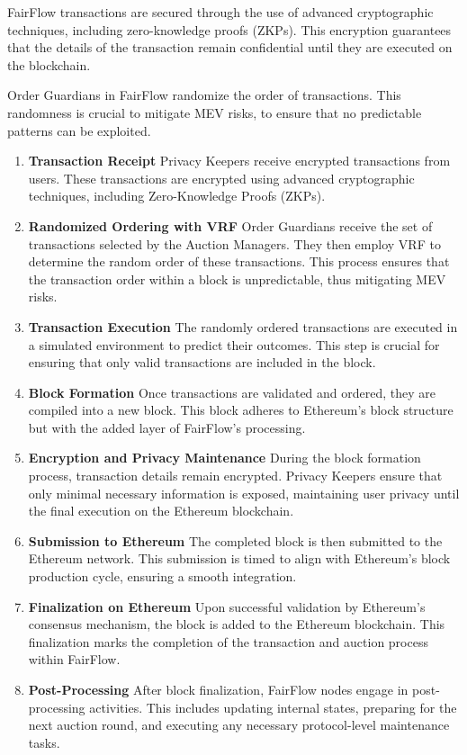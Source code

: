 \documentclass{article}
\begin{document}
FairFlow transactions are secured through the use of advanced cryptographic techniques, including zero-knowledge proofs (ZKPs). This encryption guarantees that the details of the transaction remain confidential until they are executed on the blockchain.

Order Guardians in FairFlow randomize the order of transactions. This randomness is crucial to mitigate MEV risks, to ensure that no predictable patterns can be exploited.

\begin{enumerate}
    \item \textbf{Transaction Receipt} Privacy Keepers receive encrypted transactions from users. These transactions are encrypted using advanced cryptographic techniques, including Zero-Knowledge Proofs (ZKPs).
    \item \textbf{Randomized Ordering with VRF} Order Guardians receive the set of transactions selected by the Auction Managers. They then employ VRF to determine the random order of these transactions. This process ensures that the transaction order within a block is unpredictable, thus mitigating MEV risks.
    \item \textbf{Transaction Execution} The randomly ordered transactions are executed in a simulated environment to predict their outcomes. This step is crucial for ensuring that only valid transactions are included in the block.
    \item \textbf{Block Formation} Once transactions are validated and ordered, they are compiled into a new block. This block adheres to Ethereum’s block structure but with the added layer of FairFlow’s processing.
    \item \textbf{Encryption and Privacy Maintenance} During the block formation process, transaction details remain encrypted. Privacy Keepers ensure that only minimal necessary information is exposed, maintaining user privacy until the final execution on the Ethereum blockchain.
    \item \textbf{Submission to Ethereum} The completed block is then submitted to the Ethereum network. This submission is timed to align with Ethereum's block production cycle, ensuring a smooth integration.
    \item \textbf{Finalization on Ethereum} Upon successful validation by Ethereum's consensus mechanism, the block is added to the Ethereum blockchain. This finalization marks the completion of the transaction and auction process within FairFlow.
    \item \textbf{Post-Processing} After block finalization, FairFlow nodes engage in post-processing activities. This includes updating internal states, preparing for the next auction round, and executing any necessary protocol-level maintenance tasks.
\end{enumerate}
\end{document}
